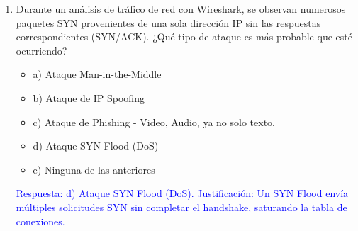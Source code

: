 \documentclass[a4paper]{article}
\begin{document}
\begin{enumerate}
    \item Durante un análisis de tráfico de red con Wireshark, se observan numerosos paquetes SYN provenientes de una sola dirección IP sin las respuestas correspondientes (SYN/ACK). ¿Qué tipo de ataque es más probable que esté ocurriendo?
    \begin{itemize}
        \item a) Ataque Man-in-the-Middle
        \item b) Ataque de IP Spoofing
        \item c) Ataque de Phishing - Video, Audio, ya no solo texto.
        \item d) Ataque SYN Flood (DoS)
        \item e) Ninguna de las anteriores
    \end{itemize}
    \textcolor{blue}{Respuesta: d) Ataque SYN Flood (DoS). Justificación: Un SYN Flood envía múltiples solicitudes SYN sin completar el handshake, saturando la tabla de conexiones.}
    \vspace{1cm}
    \vspace{1cm}
    

\end{enumerate}
\end{document}
